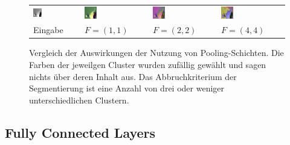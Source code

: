 \begin{figure}[h!]
\begin{tabular}{C{0.24\textwidth}C{0.24\textwidth}C{0.24\textwidth}C{0.24\textwidth}}
		\includegraphics[width=0.2\textwidth]{images/p03/p03_04.png} &
		\includegraphics[width=0.2\textwidth]{images/gen/pooling_layers/p03_04.png_1.png} &
		\includegraphics[width=0.2\textwidth]{images/gen/pooling_layers/p03_04.png_2.png} &
		\includegraphics[width=0.2\textwidth]{images/gen/pooling_layers/p03_04.png_4.png} \\
		
		\hspace{2pt}\newline\centering Eingabe & 
		\hspace{2pt}\newline\centering $F=(1, 1)$ &
		\hspace{2pt}\newline\centering $F=(2, 2)$ &
		\hspace{2pt}\newline\centering $F=(4, 4)$ 
	\end{tabular}
	\caption{Vergleich der Auswirkungen der Nutzung von Pooling-Schichten. Die Farben der jeweilgen Cluster wurden zufällig gewählt und sagen nichts über deren Inhalt aus. Das Abbruchkriterium der Segmentierung ist eine Anzahl von drei oder weniger unterschiedlichen Clustern.}
	\label{fig:maxpool_comparision}
\end{figure}

\subsection{Fully Connected Layers}
\label{ssec:network_architecture_fully_connected}

